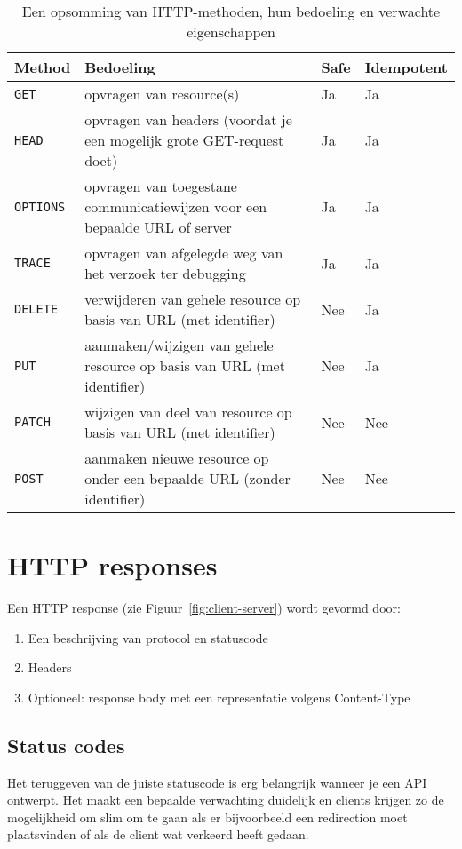\begin{table}[H]
\centering
\begin{tabularx}{\textwidth}{
    |>{\raggedright}l|>{\raggedright}X|>{\raggedright}X|>{\raggedright\arraybackslash}X|
}
\hline
\textbf{Method} & \textbf{Bedoeling} & \textbf{Safe} & \textbf{Idempotent} \\ \hline
\texttt{GET} & opvragen van resource(s) & Ja & Ja \\ \hline
\texttt{HEAD} & opvragen van headers (voordat je een mogelijk grote GET-request doet) & Ja & Ja \\ \hline
\texttt{OPTIONS} & opvragen van toegestane communicatiewijzen voor een bepaalde URL of server & Ja & Ja \\ \hline
\texttt{TRACE} & opvragen van afgelegde weg van het verzoek ter debugging & Ja & Ja \\ \hline
\texttt{DELETE} & verwijderen van gehele resource op basis van URL (met identifier) & Nee & Ja \\ \hline
\texttt{PUT} & aanmaken/wijzigen van gehele resource op basis van URL (met identifier) & Nee & Ja \\ \hline
\texttt{PATCH} & wijzigen van deel van resource op basis van URL (met identifier) & Nee & Nee \\ \hline
\texttt{POST} & aanmaken nieuwe resource op onder een bepaalde URL (zonder identifier) & Nee & Nee \\ \hline
\end{tabularx}
\caption{Een opsomming van HTTP-methoden, hun bedoeling en verwachte eigenschappen}
\label{table:http-methods}
\centering
\end{table}

\newpage
\section{HTTP responses}
Een HTTP response (zie Figuur~\ref{fig:client-server}) wordt gevormd door:
\begin{enumerate}
    \item Een beschrijving van protocol en statuscode
    \item Headers
    \item Optioneel: response body met een representatie volgens Content-Type 
\end{enumerate}

\subsection{Status codes}
Het teruggeven van de juiste statuscode is erg belangrijk wanneer je een API 
ontwerpt. Het maakt een bepaalde verwachting duidelijk en clients krijgen zo 
de mogelijkheid om slim om te gaan als er bijvoorbeeld een redirection moet plaatsvinden
of als de client wat verkeerd heeft gedaan.

